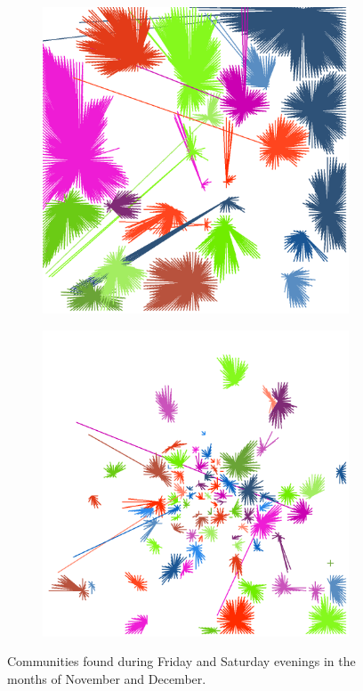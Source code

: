 \documentclass[12pt,a4paper]{article}
\begin{document}
\begin{figure}[H]
\begin{subfigure}[b]{0.3\textwidth}
\includegraphics[width=\textwidth]{weekDef/edges-6Sat-mid.png}
\end{subfigure}
\begin{subfigure}[b]{0.3\textwidth}
\includegraphics[width=\textwidth]{weekDef/edges-6Sat-small.png}
\end{subfigure}
\caption{Communities found during Friday and Saturday evenings in the months of November and December.}
\label{fig:partyMap}
\end{figure}
\end{document}
